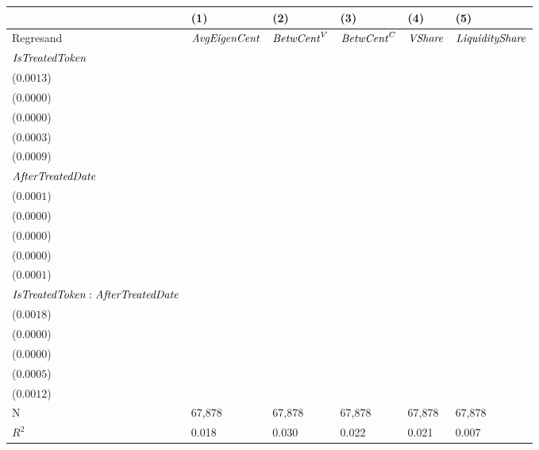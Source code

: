 \begin{tabular}{llllll}
\toprule
{} &                                      (1) &                                      (2) &                                      (3) &                                      (4) &                                      (5) \\
\midrule
Regresand                                     &                     ${\it AvgEigenCent}$ &                       ${\it BetwCent}^V$ &                       ${\it BetwCent}^C$ &                           ${\it VShare}$ &                   ${\it LiquidityShare}$ \\
${\it IsTreatedToken}$                        &  \makecell{$0.0124^{***}$ \\ ($0.0013$)} &  \makecell{$0.0004^{***}$ \\ ($0.0000$)} &  \makecell{$0.0001^{***}$ \\ ($0.0000$)} &  \makecell{$0.0034^{***}$ \\ ($0.0003$)} &  \makecell{$0.0079^{***}$ \\ ($0.0009$)} \\
${\it AfterTreatedDate}$                      &  \makecell{$0.0024^{***}$ \\ ($0.0001$)} &  \makecell{$0.0000^{***}$ \\ ($0.0000$)} &  \makecell{$0.0000^{***}$ \\ ($0.0000$)} &  \makecell{$0.0006^{***}$ \\ ($0.0000$)} &  \makecell{$0.0009^{***}$ \\ ($0.0001$)} \\
${\it IsTreatedToken}:{\it AfterTreatedDate}$ &    \makecell{$0.0034^{*}$ \\ ($0.0018$)} &    \makecell{$-0.0000^{}$ \\ ($0.0000$)} &  \makecell{$0.0000^{***}$ \\ ($0.0000$)} &    \makecell{$0.0008^{*}$ \\ ($0.0005$)} &    \makecell{$-0.0008^{}$ \\ ($0.0012$)} \\
\midrule N                                    &                                   67,878 &                                   67,878 &                                   67,878 &                                   67,878 &                                   67,878 \\
$R^2$                                         &                                    0.018 &                                    0.030 &                                    0.022 &                                    0.021 &                                    0.007 \\
\bottomrule
\end{tabular}
